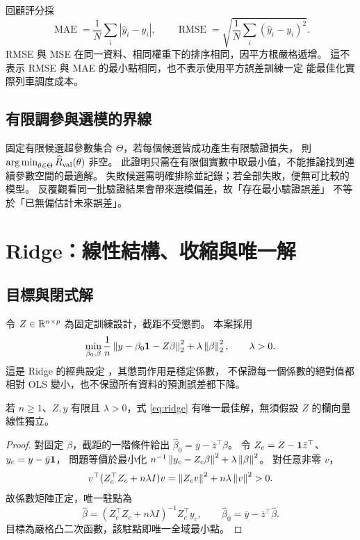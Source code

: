 回顧評分採
\[
\operatorname{MAE}=\frac1N\sum_i|\hat y_i-y_i|,\qquad
\operatorname{RMSE}=\sqrt{\frac1N\sum_i(\hat y_i-y_i)^2}.
\]
RMSE 與 MSE 在同一資料、相同權重下的排序相同，因平方根嚴格遞增。
這不表示 RMSE 與 MAE 的最小點相同，也不表示使用平方誤差訓練一定
能最佳化實際列車調度成本。

\subsection{有限調參與選模的界線}
固定有限候選超參數集合 $\Theta$，若每個候選皆成功產生有限驗證損失，
則 $\operatorname*{arg\,min}_{\theta\in\Theta}\widehat R_{\mathrm{val}}(\theta)$ 非空。
此證明只需在有限個實數中取最小值，不能推論找到連續參數空間的最適解。
失敗候選需明確排除並記錄；若全部失敗，便無可比較的模型。
反覆觀看同一批驗證結果會帶來選模偏差，故「存在最小驗證誤差」
不等於「已無偏估計未來誤差」\cite{cawley}。

\section{Ridge：線性結構、收縮與唯一解}

\subsection{目標與閉式解}
令 $Z\in\mathbb R^{n\times p}$ 為固定訓練設計，截距不受懲罰。
本案採用
\begin{equation}
\min_{\beta_0,\beta}
\frac1n\left\lVert y-\beta_0\mathbf 1-Z\beta\right\rVert_2^2+\lambda\left\lVert\beta\right\rVert_2^2,
\qquad\lambda>0.
\label{eq:ridge}
\end{equation}
這是 Ridge 的經典設定 \cite{ridge}，其懲罰作用是穩定係數，
不保證每一個係數的絕對值都相對 OLS 變小，也不保證所有資料的預測誤差都下降。

\begin{theorem}
若 $n\ge1$、$Z,y$ 有限且 $\lambda>0$，式 \eqref{eq:ridge}
有唯一最佳解，無須假設 $Z$ 的欄向量線性獨立。
\end{theorem}
\begin{proof}
對固定 $\beta$，截距的一階條件給出
$\hat\beta_0=\bar y-\bar z^\top\beta$。
令 $Z_c=Z-\mathbf 1\bar z^\top$、$y_c=y-\bar y\mathbf 1$，
問題等價於最小化
$n^{-1}\left\lVert y_c-Z_c\beta\right\rVert^2+\lambda\left\lVert\beta\right\rVert^2$。
對任意非零 $v$，
\[
v^\top(Z_c^\top Z_c+n\lambda I)v
=\left\lVert Z_cv\right\rVert^2+n\lambda\left\lVert v\right\rVert^2>0.
\]
故係數矩陣正定，唯一駐點為
\begin{equation}
\hat\beta=(Z_c^\top Z_c+n\lambda I)^{-1}Z_c^\top y_c,\qquad
\hat\beta_0=\bar y-\bar z^\top\hat\beta .
\end{equation}
目標為嚴格凸二次函數，該駐點即唯一全域最小點。
\end{proof}

